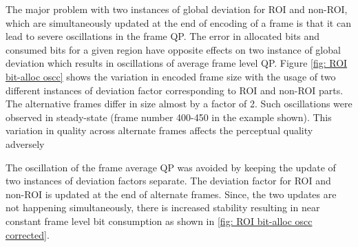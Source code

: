 \documentclass[11pt]{article} %
\begin{document}
The major problem with two instances of global deviation for ROI and non-ROI, which are simultaneously updated at the end of encoding of a frame is that it can lead to severe oscillations in the frame QP. The error in allocated bits and consumed bits for a given region have opposite effects on two instance of global deviation which results in oscillations of average frame level QP. Figure \ref{fig: ROI bit-alloc oscc} shows the variation in encoded frame size with the usage of two different instances of deviation factor corresponding to ROI and non-ROI parts. The alternative frames differ in size almost by a factor of 2. Such oscillations were observed in steady-state (frame number 400-450 in the example shown). This variation in quality across alternate frames affects the perceptual quality adversely 

The oscillation of the frame average QP was avoided by keeping the update of two instances of deviation factors separate. The deviation factor for ROI and non-ROI is updated at the end of alternate frames. Since, the two updates are not happening simultaneously, there is increased stability resulting in near constant frame level bit consumption as shown in \ref{fig: ROI bit-alloc oscc corrected}.
\end{document}
